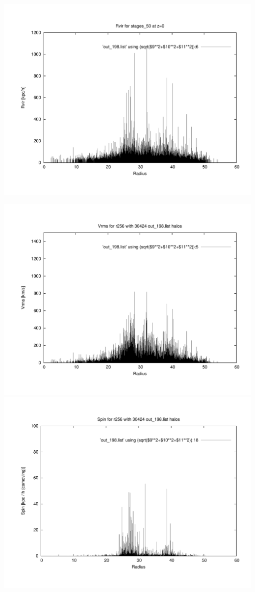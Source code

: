 \includegraphics[scale=0.3]{stages_50/plot_rvir_z0.pdf}

\includegraphics[scale=0.3]{stages_50/plot_Vrms_out_198.pdf}
\includegraphics[scale=0.3]{stages_50/plot_spin_out_198.pdf}

